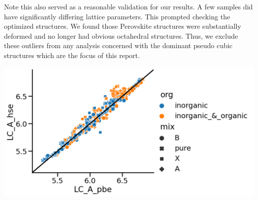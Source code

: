 \documentclass[twoside, twocolumn, 9pt, draft]{article}
\begin{document}
Note this also served as a reasonable validation for our results. A
few samples did have significantly differing lattice parameters. This
prompted checking the optimized structures. We found those Perovskite
structures were substantially deformed and no longer had obvious
octahedral structures. Thus, we exclude these outliers from any
analysis concerned with the dominant pseudo cubic structures which are
the focus of this report.

\begin{center}
\includegraphics[width=.9\linewidth]{pbe_v_hse_LC.png}
\end{center}
\end{document}
